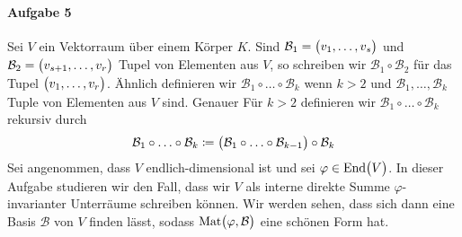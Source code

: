 \documentclass{scrreprt}
\newcommand\End{\text{End}}
\newcommand\Mat{\text{Mat}}
\begin{document}
\newpage
\paragraph{Aufgabe 5} Sei $V$ ein Vektorraum über einem Körper $K$.
Sind $\mathcal{B}_1 = \qty\big(v_1, \ldots, v_s)$ und
$\mathcal{B}_2 = \qty\big(v_{s + 1}, \ldots, v_r)$ Tupel von Elementen aus $V$,
so schreiben wir $\mathcal{B}_1 \circ \mathcal{B}_2$ für das Tupel
$\qty\big(v_1, \ldots, v_r)$.
Ähnlich definieren wir $\mathcal{B}_1 \circ \ldots \circ \mathcal{B}_k$ wenn
$k > 2$ und $\mathcal{B}_1, \ldots, \mathcal{B}_k$ Tuple von Elementen aus $V$
sind.
Genauer Für $k > 2$ definieren wir
$\mathcal{B}_1 \circ \ldots \circ \mathcal{B}_k$ rekursiv durch
\[
  \mathcal{B}_1 \circ \ldots \circ \mathcal{B}_k \coloneqq \qty\big(
    \mathcal{B}_1 \circ \ldots \circ \mathcal{B}_{k - 1}
  ) \circ \mathcal{B}_k
\]
Sei angenommen, dass $V$ endlich-dimensional ist und sei
$\varphi \in \End\qty\big(V)$.
In dieser Aufgabe studieren wir den Fall, dass wir $V$ als interne direkte
Summe $\varphi$-invarianter Unterräume schreiben können.
Wir werden sehen, dass sich dann eine Basis $\mathcal{B}$ von $V$ finden lässt,
sodass $\Mat\qty\big(\varphi, \mathcal{B})$ eine schönen Form hat.
\end{document}
